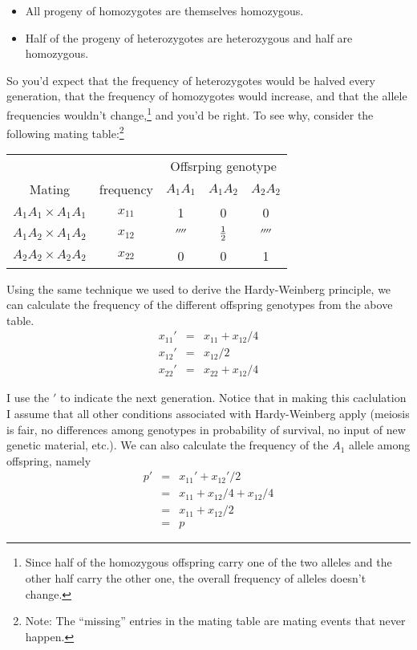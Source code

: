 \begin{itemize}

\item All progeny of homozygotes are themselves homozygous.

\item Half of the progeny of heterozygotes are heterozygous and half
are homozygous.

\end{itemize}
So you'd expect that the frequency of heterozygotes would be halved
every generation, that the frequency of homozygotes would increase,
and that the allele frequencies wouldn't change,\footnote{Since half
  of the homozygous offspring carry one of the two alleles and the
  other half carry the other one, the overall frequency of alleles
  doesn't change.} and you'd be right. To see why, consider the
following mating table:\footnote{Note: The ``missing'' entries in the
  mating table are mating events that never happen.}

\begin{center}
\begin{tabular}{ccccc}
\hline\hline
&&\multicolumn{3}{c}{Offsrping genotype} \\
Mating & frequency & $A_1A_1$ & $A_1A_2$ & $A_2A_2$ \\
\hline
$A_1A_1 \times A_1A_1$ & $x_{11}$ & 1 & 0 & 0 \\
$A_1A_2 \times A_1A_2$ & $x_{12}$ & $\fourth$ & $\frac{1}{2}$ & $\fourth$ \\
$A_2A_2 \times A_2A_2$ & $x_{22}$ & 0 & 0 & 1 \\
\hline
\end{tabular}
\end{center}

\noindent Using the same technique we used to derive the
Hardy-Weinberg principle, we can calculate the frequency of the
different offspring genotypes from the above table.
\begin{eqnarray}
x_{11}' &=& x_{11} + x_{12}/4 \\
x_{12}' &=& x_{12}/2 \\
x_{22}' &=& x_{22} + x_{12}/4
\end{eqnarray}

\noindent I use the $'$ to indicate the next generation. Notice that
in making this caclulation I assume that all other conditions
associated with Hardy-Weinberg apply (meiosis is fair, no differences
among genotypes in probability of survival, no input of new genetic
material, etc.). We can also calculate the frequency of the $A_1$
allele among offspring, namely
\begin{eqnarray}
p' &=& x_{11}' + x_{12}'/2 \\
   &=& x_{11} + x_{12}/4 + x_{12} /4 \\
   &=& x_{11} + x_{12}/2 \\
   &=& p
\end{eqnarray}

